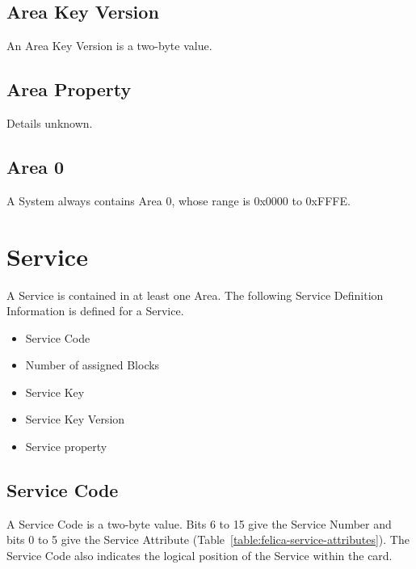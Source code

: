 \documentclass[a4paper,11pt]{report}
\begin{document}
\subsection{Area Key Version}

An Area Key Version is a two-byte value.

\subsection{Area Property}

Details unknown.

\subsection{Area 0}

A System always contains Area 0, whose range is 0x0000 to 0xFFFE.

\section{Service}

A Service is contained in at least one Area. The following Service Definition Information is defined for a Service.

\begin{itemize}
    \item Service Code
    \item Number of assigned Blocks
    \item Service Key
    \item Service Key Version
    \item Service property
\end{itemize}

\subsection{Service Code}

A Service Code is a two-byte value. Bits 6 to 15 give the Service Number and bits 0 to 5 give the Service Attribute (Table~\ref{table:felica-service-attributes}). The Service Code also indicates the logical position of the Service within the card.
\end{document}
